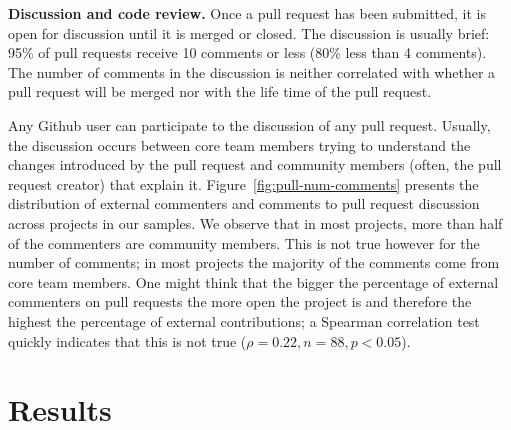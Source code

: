 \documentclass{sig-alternate}
\begin{document}


\textbf{Discussion and code review.}
Once a pull request has been submitted, it is open for discussion until
it is merged or closed. The discussion is usually brief: 95\% of pull
requests receive 10 comments or less (80\% less than 4 comments). 
The number of comments in the discussion is neither correlated with
whether a pull request will be merged nor with the life time of the
pull request.

Any Github user can participate to the discussion of any pull request. Usually,
the discussion occurs between core team members trying to understand the changes
introduced by the pull request and community members (often, the pull
request creator) that explain it. Figure~\ref{fig:pull-num-comments} presents
the distribution of external commenters and comments to pull request discussion
across projects in our samples. We observe that in most projects, more than half
of the commenters are community members. This is not true however for the number
of comments; in most projects the majority of the comments come from core team
members. One might think that the bigger the percentage of external commenters
on pull requests the more open the project is and therefore the highest the
percentage of external contributions; a Spearman correlation test quickly
indicates that this is not true ($\rho = 0.22, n = 88, p < 0.05$).

\section{Results}
\label{sec:accrej}
\end{document}
